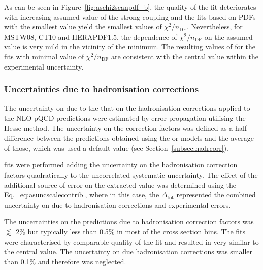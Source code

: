 As can be seen in Figure~\ref{fig:aschi2scanpdf_b}, the quality of the fit deteriorates with increasing assumed value of the strong coupling and the fits based on PDFs with the smallest \asz value yield the smallest values of $\chi^2/n_\text{DF}$. Nevertheless, for MSTW08, CT10 and HERAPDF1.5, the dependence of $\chi^2/n_\text{DF}$ on the assumed value is very mild in the vicinity of the minimum. The resulting values of \as for the fits with minimal value of $\chi^2/n_\text{DF}$ are consistent with the central value within the experimental uncertainty.

\subsubsection{Uncertainties due to hadronisation corrections}
\label{subsec:ashadrunc}
The uncertainty on \as due to the that on the hadronisation corrections applied to the NLO pQCD predictions were estimated by error propagation utilising the Hesse method. The uncertainty on the correction factors was defined as a half-difference between the predictions obtained using the \ariadne or \lepto models and the average of those, which was used a default value (see Section~\ref{subsec:hadrcorr}).

\as fits were performed adding the uncertainty on the hadronisation correction factors quadratically to the uncorrelated systematic uncertainty. The effect of the additional source of error on the extracted \asz value was determined using the Eq.~\eqref{eq:asuncscalecontrib}, where in this case, the $\Delta_\text{tot}$ represented the combined uncertainty on \as due to hadronisation corrections and experimental errors.

The uncertainties on the predictions due to hadronisation correction factors was $\lessapprox$ 2\% but typically less than 0.5\% in most of the cross section bins. The \as fits were characterised by comparable quality of the fit and resulted in \asz very similar to the central value. The uncertainty on \asz due hadronisation corrections was smaller than 0.1\% and therefore was neglected.